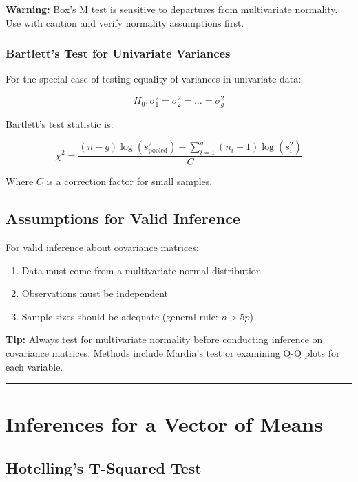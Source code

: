\documentclass[
]{article}
\begin{document}
\textbf{Warning: } Box's M test is sensitive to departures from
multivariate normality. Use with caution and verify normality
assumptions first.

\subsubsection{Bartlett's Test for Univariate Variances}

For the special case of testing equality of variances in univariate
data:

\[H_{0}:\sigma_{1}^{2} = \sigma_{2}^{2} = \ldots = \sigma_{g}^{2}\]

Bartlett's test statistic is:

\[\chi^{2} = \frac{(n - g)\log(s_{\text{pooled}}^{2}) - \sum_{i = 1}^{g}\left( n_{i} - 1 \right)\log(s_{i}^{2})}{C}\]

Where \(C\) is a correction factor for small samples.

\textbf{ }

\subsection{Assumptions for Valid Inference}

For valid inference about covariance matrices:

\begin{enumerate}
\item
  Data must come from a multivariate normal distribution
\item
  Observations must be independent
\item
  Sample sizes should be adequate (general rule: \(n > 5p\))
\end{enumerate}

\textbf{Tip: } Always test for multivariate normality before conducting
inference on covariance matrices. Methods include Mardia's test or
examining Q-Q plots for each variable.

\begin{center}\rule{0.5\linewidth}{0.5pt}\end{center}

\textbf{ }

\section{Inferences for a Vector of Means}

\textbf{ }

\subsection{Hotelling's T-Squared Test}
\end{document}
